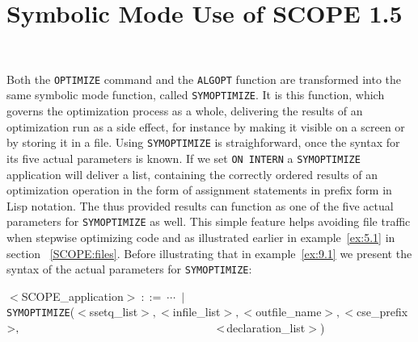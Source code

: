 {\section{Symbolic Mode Use of SCOPE 1.5}~\label{SCOPE:symb}

Both the {\tt OPTIMIZE} command and the {\tt ALGOPT} function are transformed
into the same symbolic mode function, called {\tt SYMOPTIMIZE}. It is this
function, which governs the optimization process as a whole, delivering
the results of an optimization run as a side effect, for instance by making
it visible on a screen or by storing it in a file. Using {\tt SYMOPTIMIZE}
is straighforward, once the syntax for its five actual parameters is known.
If we set {\tt ON INTERN} a {\tt SYMOPTIMIZE} application will deliver a
list, containing the correctly ordered results of an optimization operation 
in the form of assignment statements in prefix form in Lisp notation. The thus
provided results can function as one of the five actual parameters for
{\tt SYMOPTIMIZE} as well. This simple feature helps avoiding file traffic
when stepwise optimizing code and as illustrated earlier in example~\ref{ex:5.1}
in section ~\ref{SCOPE:files}. Before illustrating that in example~\ref{ex:9.1}
we present the syntax of the actual parameters for {\tt SYMOPTIMIZE}:

$<$SCOPE\_application$>~::=~\cdots~\mid$\\
\hspace*{1cm} {\tt SYMOPTIMIZE}($<$ssetq\_list$>,<$infile\_list$>,<$outfile\_name$>,<$cse\_prefix$>,\\
\hspace*{6cm} <$declaration\_list$>$)

}
